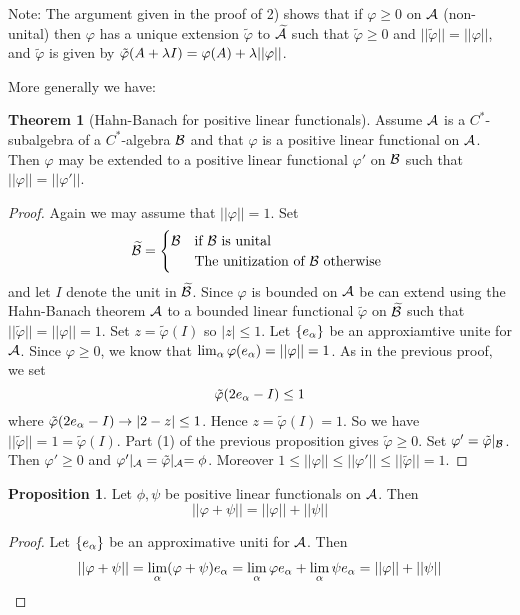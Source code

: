 \documentclass[10pt,english,a4paper]{article}
\theoremstyle{definition}
\newtheorem*{theorem}{Theorem}
\newtheorem*{proposition}{Proposition}
\def\tAs{\widetilde{\As}}
\def\tBs{\widetilde{\Bs}}
\def\tvphi{\tilde{\varphi}}
\def\vphi{\varphi}
\begin{document}
Note:
The argument given in the proof of 2) shows that if $\varphi \geq 0$ on $\mathcal{A}$ 
(non-unital) then $\varphi$ has a unique extension $\tvphi$ to $\tAs$ such that 
$\tvphi\geq 0$ and $||\tvphi|| = ||\vphi||$, and $\tvphi$ is given by
$\tvphi(A + \la I) = \vphi(A) + \la ||\vphi||$. 

More generally we have:  

\begin{theorem}[Hahn-Banach for positive linear functionals]
   Assume $\mathcal{A}$ is a $C^*$-subalgebra of a $C^*$-algebra $\mathcal{B}$ and that 
$\vphi$ is a positive linear functional on $\mathcal{A}$. Then $\varphi$ may be 
extended to a positive linear functional $\vphi'$ on $\mathcal{B}$ such that 
$||\vphi|| = ||\vphi'||$.
\end{theorem}

\begin{proof}
    Again we may assume that $||\vphi||=1$. Set 
\[ \widetilde{\mathcal{B}} = \begin{cases} \mathcal{B} &\text{if $\mathcal{B}$ is unital}\\ &\text{The unitization of $\mathcal{B}$ otherwise } \end{cases}\]
and let $I$ denote the unit in $\tBs$.
Since $\vphi$ is bounded on $\mathcal{A}$ be can extend using the Hahn-Banach theorem 
$\mathcal{A}$ to a bounded linear functional $\tvphi$ on $\tBs$ such that $||\tvphi|| =
||\vphi|| = 1$. Set $z = \tvphi(I)$ so $|z| \leq 1$. Let $\{e_{\alpha}\}$ be an 
approxiamtive unite for $\mathcal{A}$. Since $\vphi \geq 0$, we know that $\lim_{\al} \vphi(e_{\al}) = ||\vphi|| = 1$. As in the previous proof, we set 
\[\tvphi(2e_{\al} - I) \leq 1\]
where $\tvphi(2e_{\al} - I) \to |2-z|\leq 1 $. Hence 
$z = \tvphi(I) = 1$. So we have $||\tvphi|| = 1 = \tvphi(I)$. Part (1) of the previous proposition
gives $\tvphi\geq 0$.
Set $\vphi' = \tvphi\lvert_{\Bs}$. Then $\vphi'\geq 0$ and 
$\vphi'\vert_{\As} = \tvphi\lvert_{\As}  = \phi$. Moreover 
$1 \leq ||\vphi|| \leq ||\vphi'|| \leq ||\tvphi|| =1$.
\end{proof}

\begin{proposition}
    Let $\phi, \psi$ be positive linear functionals on $\mathcal{A}$. Then 
    \[ ||\vphi +\psi || = ||\vphi|| + ||\psi|| \]
\end{proposition}
\begin{proof}
    Let $\{e_{\alpha}\}$ be an approximative uniti for $\mathcal{A}$. Then 
    \begin{align*}
        ||\vphi +\psi|| = \lim_{\al} (\vphi+\psi)e_{\al} = \lim_{\al}\vphi e_{\al}
        + \lim_{\al} \psi e_{\al} = ||\vphi ||+||\psi||
    \end{align*}    
\end{proof}
\end{document}
